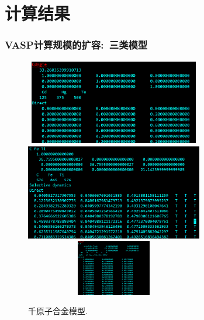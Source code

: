 \section{计算结果}

\frame
{
	\frametitle{\textrm{VASP}计算规模的扩容:~三类模型}
\begin{figure}[h!]
\centering
\vskip -0.6in
\includegraphics[height=1.45in,width=3.05in,viewport=0 100 656 429,clip]{Figures/VASP_huge_SJTU-CdHgTe_POSCAR.png}
\vskip -0.6in
\includegraphics[height=1.65in,width=3.05in,viewport=0 150 726 519,clip]{Figures/VASP_huge_USTB-CFeTi_POSCAR.png}
\vskip -0.05in
\includegraphics[height=0.95in,width=3.05in,viewport=0 320 680 543,clip]{Figures/VASP_huge_Ningde-PbONICH_POSCAR.png}
\caption{\tiny \textrm{千原子合金模型.}}%
\label{VASP-huge_Model}
\end{figure} 
}

